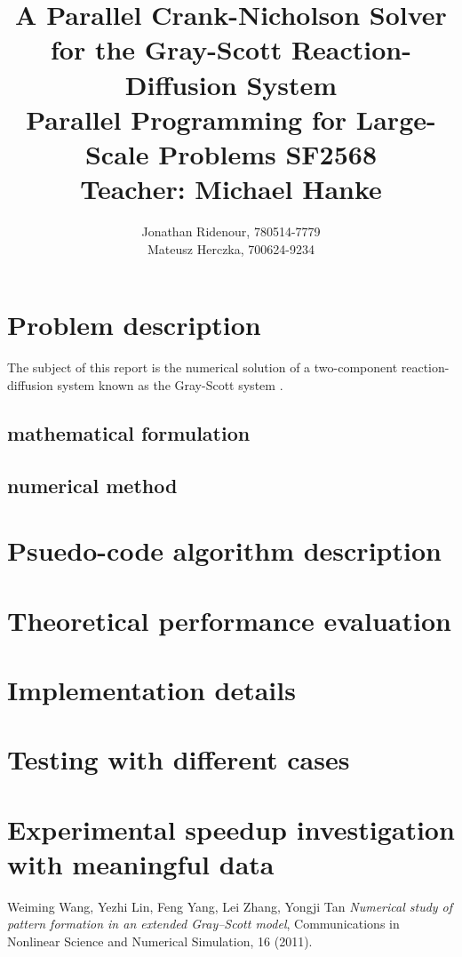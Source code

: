 \documentclass[a4paper,11pt]{article}
\title{ A Parallel Crank-Nicholson Solver for the Gray-Scott Reaction-Diffusion System\\ 
\vspace{1.2cm}
\large Parallel Programming for Large-Scale Problems SF2568 \\ 
Teacher: Michael Hanke}
\author{Jonathan Ridenour, 780514-7779\\
Mateusz Herczka, 700624-9234}
\begin{document}
%
\maketitle
\pagebreak
\section*{Problem description}
The subject of this report is the numerical solution of a two-component reaction-diffusion system known as the Gray-Scott system \cite{Wang}. 
\subsection*{mathematical formulation}
\subsection*{numerical method}
\section*{Psuedo-code algorithm description}
\section*{Theoretical performance evaluation}
\section*{Implementation details}
\section*{Testing with different cases}
\section*{Experimental speedup investigation with meaningful data}

\begin{thebibliography}{}
 Weiming Wang, Yezhi Lin, Feng Yang, Lei Zhang, Yongji Tan {\it Numerical study of pattern formation in an extended Gray–Scott model}, Communications in Nonlinear Science and Numerical Simulation, 16 (2011).
\end{thebibliography}
\end{document}
